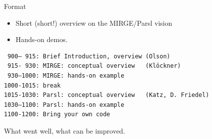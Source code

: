 \documentclass[aspectratio=169]{beamer}
\begin{document}
\begin{frame}[fragile=singleslide]{Format}

  \begin{itemize}
    \item Short (short!) overview on the MIRGE/Parsl vision
    \item Hands-on demos.
  \end{itemize}
  \begin{verbatim}
 900– 915: Brief Introduction, overview (Olson)
 915- 930: MIRGE: conceptual overview   (Klöckner)
 930–1000: MIRGE: hands-on example
1000-1015: break
1015-1030: Parsl: conceptual overview   (Katz, D. Friedel)
1030–1100: Parsl: hands-on example
1100-1200: Bring your own code
  \end{verbatim}


  \bigskip
    What went well, what can be improved.
\end{frame}


\end{document}
